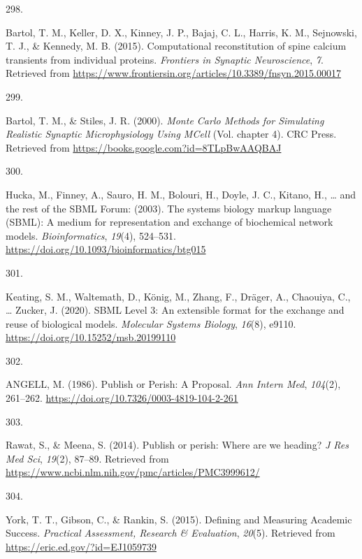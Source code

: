 \documentclass[
  11pt,
  letterpaper,
]{scrreprt}
\newlength{\cslhangindent}
\newlength{\csllabelwidth}
\newenvironment{CSLReferences}[2] %
 {\begin{list}{}{%
  \setlength{\itemindent}{0pt}
  \setlength{\leftmargin}{0pt}
  \setlength{\parsep}{0pt}
  \ifodd #1
   \setlength{\leftmargin}{\cslhangindent}
   \setlength{\itemindent}{-1\cslhangindent}
  \fi
  \setlength{\itemsep}{#2\baselineskip}}}
 {\end{list}}
\newcommand{\CSLLeftMargin}[1]{\parbox[t]{\csllabelwidth}{\strut#1\strut}}
\newcommand{\CSLRightInline}[1]{\parbox[t]{\linewidth - \csllabelwidth}{\strut#1\strut}}
\begin{document}
\begin{CSLReferences}{0}{0}
\CSLLeftMargin{298. }%
\CSLRightInline{Bartol, T. M., Keller, D. X., Kinney, J. P., Bajaj, C.
L., Harris, K. M., Sejnowski, T. J., \& Kennedy, M. B. (2015).
Computational reconstitution of spine calcium transients from individual
proteins. \emph{Frontiers in Synaptic Neuroscience}, \emph{7}. Retrieved
from
\url{https://www.frontiersin.org/articles/10.3389/fnsyn.2015.00017}}

\CSLLeftMargin{299. }%
\CSLRightInline{Bartol, T. M., \& Stiles, J. R. (2000). \emph{Monte
{Carlo Methods} for {Simulating Realistic Synaptic Microphysiology Using
MCell}} (Vol. chapter 4). CRC Press. Retrieved from
\url{https://books.google.com?id=8TLpBwAAQBAJ}}

\CSLLeftMargin{300. }%
\CSLRightInline{Hucka, M., Finney, A., Sauro, H. M., Bolouri, H., Doyle,
J. C., Kitano, H., \ldots{} and the rest of the SBML Forum: (2003). The
systems biology markup language ({SBML}): A medium for representation
and exchange of biochemical network models. \emph{Bioinformatics},
\emph{19}(4), 524--531.
\url{https://doi.org/10.1093/bioinformatics/btg015}}

\CSLLeftMargin{301. }%
\CSLRightInline{Keating, S. M., Waltemath, D., König, M., Zhang, F.,
Dräger, A., Chaouiya, C., \ldots{} Zucker, J. (2020). {SBML Level} 3: An
extensible format for the exchange and reuse of biological models.
\emph{Molecular Systems Biology}, \emph{16}(8), e9110.
\url{https://doi.org/10.15252/msb.20199110}}

\CSLLeftMargin{302. }%
\CSLRightInline{ANGELL, M. (1986). Publish or {Perish}: {A Proposal}.
\emph{Ann Intern Med}, \emph{104}(2), 261--262.
\url{https://doi.org/10.7326/0003-4819-104-2-261}}

\CSLLeftMargin{303. }%
\CSLRightInline{Rawat, S., \& Meena, S. (2014). Publish or perish:
{Where} are we heading? \emph{J Res Med Sci}, \emph{19}(2), 87--89.
Retrieved from
\url{https://www.ncbi.nlm.nih.gov/pmc/articles/PMC3999612/}}

\CSLLeftMargin{304. }%
\CSLRightInline{York, T. T., Gibson, C., \& Rankin, S. (2015). Defining
and {Measuring Academic Success}. \emph{Practical Assessment, Research
\& Evaluation}, \emph{20}(5). Retrieved from
\url{https://eric.ed.gov/?id=EJ1059739}}


\end{CSLReferences}
\end{document}

